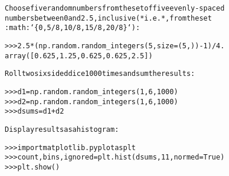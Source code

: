 \begin{boxedminipage}{\funcwidth}
\begin{alltt}
Choose five random numbers from the set of five evenly-spaced
numbers between 0 and 2.5, inclusive (*i.e.*, from the set
:math:`\{0, 5/8, 10/8, 15/8, 20/8\}`):

{\textgreater}{\textgreater}{\textgreater} 2.5 * (np.random.random\_integers(5, size=(5,)) - 1) / 4.
array([ 0.625,  1.25 ,  0.625,  0.625,  2.5  ])

Roll two six sided dice 1000 times and sum the results:

{\textgreater}{\textgreater}{\textgreater} d1 = np.random.random\_integers(1, 6, 1000)
{\textgreater}{\textgreater}{\textgreater} d2 = np.random.random\_integers(1, 6, 1000)
{\textgreater}{\textgreater}{\textgreater} dsums = d1 + d2

Display results as a histogram:

{\textgreater}{\textgreater}{\textgreater} import matplotlib.pyplot as plt
{\textgreater}{\textgreater}{\textgreater} count, bins, ignored = plt.hist(dsums, 11, normed=True)
{\textgreater}{\textgreater}{\textgreater} plt.show()
\end{alltt}

\setlength{\parskip}{1ex}
    \end{boxedminipage}

    \label{QSTK:qstklearn:mldiagnostics:random_sample}

    \vspace{0.5ex}

